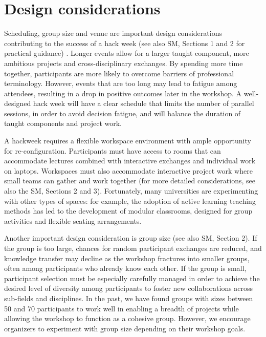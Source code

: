 \section*{Design considerations}

Scheduling, group size and venue are important design considerations contributing to the success of a hack week (see also SM, Sections 1 and 2 for practical guidance) .   
Longer events allow for a larger taught component, more ambitious projects and cross-disciplinary exchanges. 
By spending more time together, participants are more likely to overcome barriers of professional terminology.
However, events that are too long may lead to fatigue among attendees, resulting in a drop in positive outcomes later in the workshop.
A well-designed hack week will have a clear schedule that limits the number of parallel sessions, in order to avoid decision fatigue, and will balance the duration of taught components and project work. 

A hackweek requires a flexible workspace environment with ample opportunity for re-configuration. 
Participants must have access to rooms that can accommodate lectures combined with interactive exchanges and individual work on laptops. 
Workspaces must also accommodate interactive project work where small teams can gather and work together (for more detailed considerations, see also the SM, Sections 2 and 3).    
Fortunately, many universities are experimenting with other types of spaces: for example, the adoption of active learning teaching methods \cite{prince2004} has led to the development of modular classrooms, designed for group activities and flexible seating arrangements.

Another important design consideration is group size (see also SM, Section 2).
If the group is too large, chances for random participant exchanges are reduced, and knowledge transfer may decline as the workshop fractures into smaller groups, often among participants who already know each other.
If the group is small, participant selection must be especially carefully managed in order to achieve the desired level of diversity among participants to foster new collaborations across sub-fields and disciplines.
In the past, we have found groups with sizes between 50 and 70 participants to work well in enabling a breadth of projects while allowing the workshop to function as a cohesive group. However, we encourage organizers to experiment with group size depending on their workshop goals.

